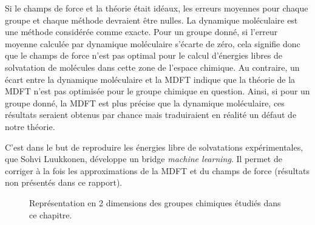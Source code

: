 Si le champs de force et la théorie était idéaux, les erreurs moyennes pour chaque groupe et chaque méthode devraient être nulles. La dynamique moléculaire est une méthode considérée comme exacte. Pour un groupe donné, si l'erreur moyenne calculée par dynamique moléculaire s'écarte de zéro, cela signifie donc que le champs de force n'est pas optimal pour le calcul d'énergies libres de solvatation de molécules dans cette zone de l'espace chimique. Au contraire, un écart entre la dynamique moléculaire et la MDFT indique que la théorie de la MDFT n'est pas optimisée pour le groupe chimique en question. Ainsi, si pour un groupe donné, la MDFT est plus précise que la dynamique moléculaire, ces résultats seraient obtenus par chance mais traduiraient en réalité un défaut de notre théorie. 

C'est dans le but de reproduire les énergies libre de solvatations expérimentales, que Sohvi Luukkonen, développe un bridge \textit{machine learning}. Il permet de corriger à la fois les approximations de la MDFT et du champs de force (résultats non présentés dans ce rapport).

\begin{figure}[H]
  \centering
  \caption{Représentation en 2 dimensions des groupes chimiques étudiés dans ce chapitre. \protect\footnotemark}
  \label{fig:groupes_chimiques}
\end{figure}

